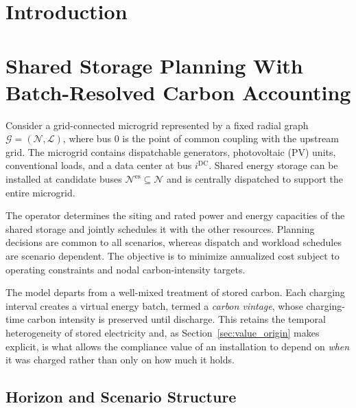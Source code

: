 \documentclass[journal]{IEEEtran}
\begin{document}
\raggedbottom

\section{Introduction}


\section{Shared Storage Planning With Batch-Resolved Carbon Accounting}
\label{sec:model}

Consider a grid-connected microgrid represented by a fixed radial graph
$\mathscr{G}=(\mathcal{N},\mathcal{L})$, where bus $0$ is the point of
common coupling with the upstream grid. The microgrid contains
dispatchable generators, photovoltaic (PV) units, conventional loads, and
a data center at bus $i^{\mathrm{DC}}$. Shared energy storage can be
installed at candidate buses
$\mathcal{N}^{\mathrm{es}}\subseteq\mathcal{N}$ and is centrally
dispatched to support the entire microgrid.

The operator determines the siting and rated power and energy capacities
of the shared storage and jointly schedules it with the other resources.
Planning decisions are common to all scenarios, whereas dispatch and
workload schedules are scenario dependent. The objective is to minimize
annualized cost subject to operating constraints and nodal
carbon-intensity targets.

The model departs from a well-mixed treatment of stored carbon. Each
charging interval creates a virtual energy batch, termed a
\emph{carbon vintage}, whose charging-time carbon intensity is preserved
until discharge. This retains the temporal heterogeneity of stored
electricity and, as Section~\ref{sec:value_origin} makes explicit, is what
allows the compliance value of an installation to depend on \emph{when}
it was charged rather than only on how much it holds.

\subsection{Horizon and Scenario Structure}
\label{sec:horizon}
\end{document}
